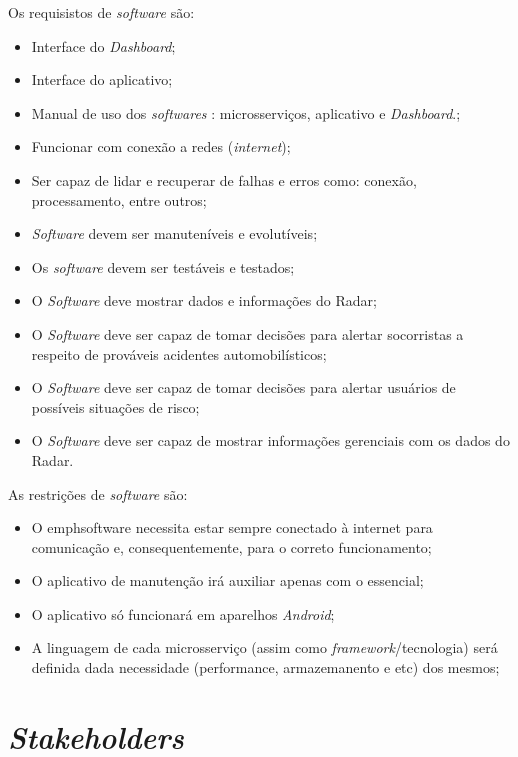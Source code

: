 Os requisistos de \emph{software} são:

\begin{itemize}
    \item Interface do \emph{Dashboard};
    \item Interface do aplicativo;
    \item Manual de uso dos \emph{softwares} : microsserviços, aplicativo e \emph{Dashboard}.;
    \item Funcionar com conexão a redes (\emph{internet});
    \item Ser capaz de lidar e recuperar de falhas e erros como: conexão, processamento, entre outros;
    \item \emph{Software} devem ser manuteníveis e evolutíveis;
    \item Os \emph{software} devem ser testáveis e testados;
    \item O \emph{Software} deve mostrar dados e informações do Radar;
    \item O \emph{Software} deve ser capaz de tomar decisões para alertar socorristas a respeito de prováveis acidentes automobilísticos;
    \item O \emph{Software} deve ser capaz de tomar decisões para alertar usuários de possíveis situações de risco;
    \item O \emph{Software} deve ser capaz de mostrar informações gerenciais com os dados do Radar.
\end{itemize}

As restrições de \emph{software} são:

\begin{itemize}
    \item O emph{software} necessita estar sempre conectado à internet para comunicação e, consequentemente, para o correto funcionamento;
    \item O aplicativo de manutenção irá auxiliar apenas com o essencial;
    \item O aplicativo só funcionará em aparelhos \emph{Android};
    \item A linguagem de cada microsserviço (assim como \emph{framework}/tecnologia) será definida dada necessidade (performance, armazemanento e etc) dos mesmos;
\end{itemize}

\section{\emph{Stakeholders}}


